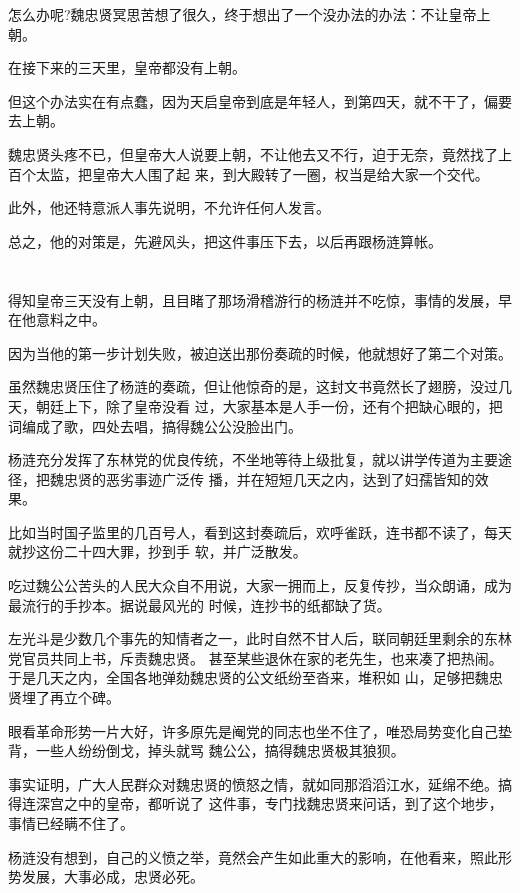 \documentclass[11pt,a4paper,onecolumn]{article}
\begin{document}
怎么办呢?魏忠贤冥思苦想了很久，终于想出了一个没办法的办法：不让皇帝上朝。

在接下来的三天里，皇帝都没有上朝。

但这个办法实在有点蠢，因为天启皇帝到底是年轻人，到第四天，就不干了，偏要去上朝。

魏忠贤头疼不已，但皇帝大人说要上朝，不让他去又不行，迫于无奈，竟然找了上百个太监，把皇帝大人围了起
来，到大殿转了一圈，权当是给大家一个交代。

此外，他还特意派人事先说明，不允许任何人发言。

总之，他的对策是，先避风头，把这件事压下去，以后再跟杨涟算帐。

\section[\thesection]{}

得知皇帝三天没有上朝，且目睹了那场滑稽游行的杨涟并不吃惊，事情的发展，早在他意料之中。

因为当他的第一步计划失败，被迫送出那份奏疏的时候，他就想好了第二个对策。

虽然魏忠贤压住了杨涟的奏疏，但让他惊奇的是，这封文书竟然长了翅膀，没过几天，朝廷上下，除了皇帝没看
过，大家基本是人手一份，还有个把缺心眼的，把词编成了歌，四处去唱，搞得魏公公没脸出门。

杨涟充分发挥了东林党的优良传统，不坐地等待上级批复，就以讲学传道为主要途径，把魏忠贤的恶劣事迹广泛传
播，并在短短几天之内，达到了妇孺皆知的效果。

比如当时国子监里的几百号人，看到这封奏疏后，欢呼雀跃，连书都不读了，每天就抄这份二十四大罪，抄到手
软，并广泛散发。

吃过魏公公苦头的人民大众自不用说，大家一拥而上，反复传抄，当众朗诵，成为最流行的手抄本。据说最风光的
时候，连抄书的纸都缺了货。

左光斗是少数几个事先的知情者之一，此时自然不甘人后，联同朝廷里剩余的东林党官员共同上书，斥责魏忠贤。
甚至某些退休在家的老先生，也来凑了把热闹。于是几天之内，全国各地弹劾魏忠贤的公文纸纷至沓来，堆积如
山，足够把魏忠贤埋了再立个碑。

眼看革命形势一片大好，许多原先是阉党的同志也坐不住了，唯恐局势变化自己垫背，一些人纷纷倒戈，掉头就骂
魏公公，搞得魏忠贤极其狼狈。

事实证明，广大人民群众对魏忠贤的愤怒之情，就如同那滔滔江水，延绵不绝。搞得连深宫之中的皇帝，都听说了
这件事，专门找魏忠贤来问话，到了这个地步，事情已经瞒不住了。

杨涟没有想到，自己的义愤之举，竟然会产生如此重大的影响，在他看来，照此形势发展，大事必成，忠贤必死。
\end{document}
